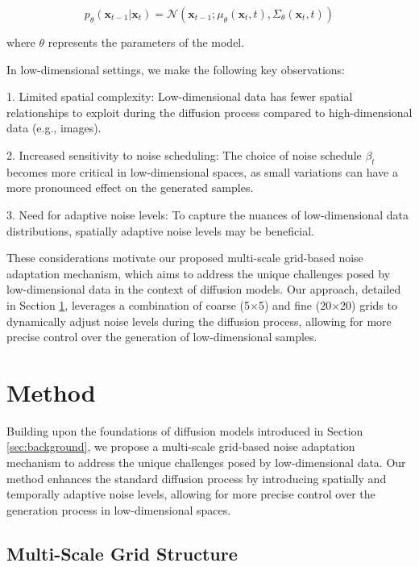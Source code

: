 \documentclass{article} %
\begin{document}
\begin{equation}
    p_\theta(\mathbf{x}_{t-1} | \mathbf{x}_t) = \mathcal{N}(\mathbf{x}_{t-1}; \mu_\theta(\mathbf{x}_t, t), \Sigma_\theta(\mathbf{x}_t, t))
\end{equation}

where $\theta$ represents the parameters of the model.

In low-dimensional settings, we make the following key observations:

1. Limited spatial complexity: Low-dimensional data has fewer spatial relationships to exploit during the diffusion process compared to high-dimensional data (e.g., images).

2. Increased sensitivity to noise scheduling: The choice of noise schedule $\beta_t$ becomes more critical in low-dimensional spaces, as small variations can have a more pronounced effect on the generated samples.

3. Need for adaptive noise levels: To capture the nuances of low-dimensional data distributions, spatially adaptive noise levels may be beneficial.

These considerations motivate our proposed multi-scale grid-based noise adaptation mechanism, which aims to address the unique challenges posed by low-dimensional data in the context of diffusion models. Our approach, detailed in Section \ref{sec:method}, leverages a combination of coarse (5$\times$5) and fine (20$\times$20) grids to dynamically adjust noise levels during the diffusion process, allowing for more precise control over the generation of low-dimensional samples.

\section{Method}
\label{sec:method}

Building upon the foundations of diffusion models introduced in Section \ref{sec:background}, we propose a multi-scale grid-based noise adaptation mechanism to address the unique challenges posed by low-dimensional data. Our method enhances the standard diffusion process by introducing spatially and temporally adaptive noise levels, allowing for more precise control over the generation process in low-dimensional spaces.

\subsection{Multi-Scale Grid Structure}
\end{document}
